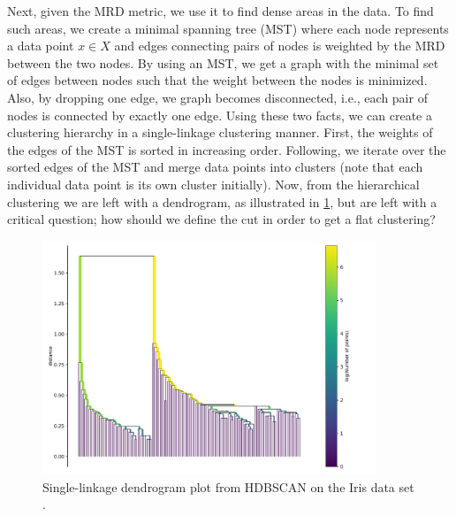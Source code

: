 Next, given the MRD metric, we use it to find dense areas in the data. To find such areas, we create a minimal spanning tree (MST) where each node represents a data point $x \in X$ and edges connecting pairs of nodes is weighted by the MRD between the two nodes. By using an MST, we get a graph with the minimal set of edges between nodes such that the weight between the nodes is minimized. Also, by dropping one edge, we graph becomes disconnected, i.e., each pair of nodes is connected by exactly one edge. Using these two facts, we can create a clustering hierarchy in a single-linkage clustering manner. First, the weights of the edges of the MST is sorted in increasing order. Following, we iterate over the sorted edges of the MST and merge data points into clusters (note that each individual data point is its own cluster initially). Now, from the hierarchical clustering we are left with a dendrogram, as illustrated in \cref{fig:hdbscan-dendrogram-example}, but are left with a critical question; how should we define the cut in order to get a flat clustering?
\begin{figure}[H]
    \centering
    \includegraphics[width=10cm]{thesis/figures/hdbscan-single-linage-tree-example.pdf}
    \caption{Single-linkage dendrogram plot from HDBSCAN on the Iris data set \cite{Fisher1936}.}
    \label{fig:hdbscan-dendrogram-example}
\end{figure}

